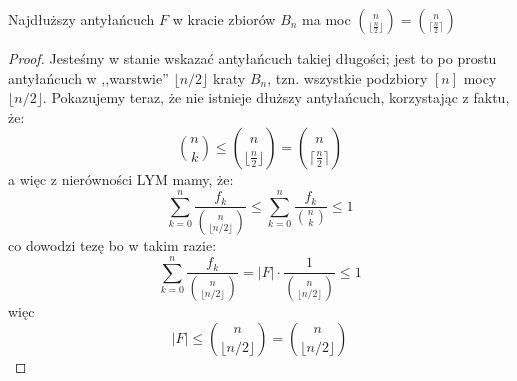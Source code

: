     \begin{theorem}
       Najdłuższy antyłańcuch \(F\) w kracie zbiorów $B_n$ ma moc $\binom{n}{\lfloor\frac{n}{2}\rfloor} = \binom{n}{\lceil\frac{n}{2}\rceil}$
    \end{theorem}

    \begin{proof}
        Jesteśmy w stanie wskazać antyłańcuch takiej długości; jest to po prostu antyłańcuch w ,,warstwie'' $\lfloor n/2 \rfloor$ kraty $B_n$, tzn. wszystkie podzbiory $[n]$ mocy $\lfloor n/2 \rfloor$. Pokazujemy teraz, że nie istnieje dłuższy antyłańcuch, korzystając z faktu, że:
       \begin{equation*}
            \binom{n}{k} \leq \binom{n}{\lfloor\frac{n}{2}\rfloor} = \binom{n}{\lceil\frac{n}{2}\rceil}
       \end{equation*}
       a więc z nierówności LYM mamy, że:
       \begin{equation*}
           \sum_{k=0}^{n}\frac{f_k}{\binom{n}{\lfloor n/2 \rfloor}} \leq \sum_{k=0}^{n}\frac{f_k}{\binom{n}{k}} \leq 1
       \end{equation*}
       co dowodzi tezę bo w takim razie:
       \begin{equation*}
           \sum_{k=0}^{n}\frac{f_k}{\binom{n}{\lfloor n/2 \rfloor}} = 
           |F| \cdot \frac{1}{\binom{n}{\lfloor n/2 \rfloor}} \leq 1
        \end{equation*}
        więc 
        \begin{equation*}
           |F| \leq \binom{n}{\lfloor n/2 \rfloor} =
           \binom{n}{\lfloor n/2 \rfloor}
       \end{equation*}
       \end{proof}